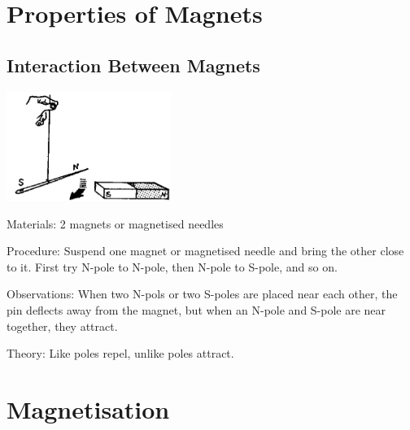\begin{multicols}{2}

\section*{Properties of Magnets}


\subsection{Interaction Between Magnets}

\begin{center}
\includegraphics[width=0.4\textwidth]{./img/source/mag-interaction.png}
\end{center}

\begin{description*}
\item[Materials:]{2 magnets or magnetised needles}
\item[Procedure:]{Suspend one magnet or magnetised needle and bring the other close to it. First try N-pole to N-pole, then N-pole to S-pole, and so on.}
\item[Observations:]{When two N-pols or two S-poles are placed near each other, the pin deflects away from the magnet, but when an N-pole and S-pole are near together, they attract.}
\item[Theory:]{Like poles repel, unlike poles attract.}
\end{description*}


\section*{Magnetisation}



\end{multicols}
